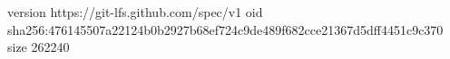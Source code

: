 version https://git-lfs.github.com/spec/v1
oid sha256:476145507a22124b0b2927b68ef724c9de489f682cce21367d5dff4451c9c370
size 262240

